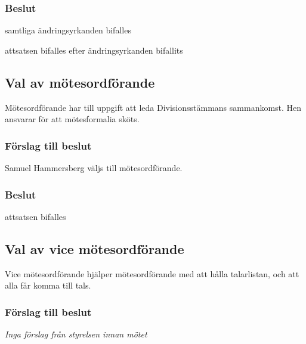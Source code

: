 \documentclass[protokoll]{dvd}
\begin{document}
\subsubsection*{Beslut}

\begin{attsatser}
    \item samtliga ändringsyrkanden bifalles
    \item attsatsen bifalles efter ändringsyrkanden bifallits
\end{attsatser}

\subsection{Val av mötesordförande}

Mötesordförande har till uppgift att leda Divisionsstämmans sammankomst.
Hen ansvarar för att mötesformalia sköts.

\subsubsection*{Förslag till beslut}

\begin{attsatser}
	\item Samuel Hammersberg väljs till mötesordförande.
\end{attsatser}

\subsubsection*{Beslut}

\begin{attsatser}
    \item attsatsen bifalles
\end{attsatser}

\subsection{Val av vice mötesordförande}

Vice mötesordförande hjälper mötesordförande med att hålla talarlistan, och att alla får komma till tals.

\subsubsection*{Förslag till beslut}

\begin{attsatser}
	\item \emph{Inga förslag från styrelsen innan mötet}
\end{attsatser}
\end{document}
